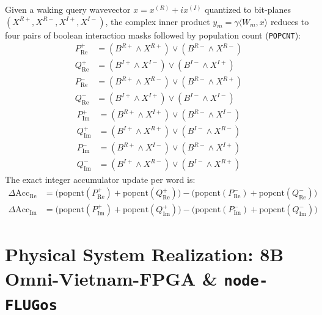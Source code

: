 \documentclass[10pt, twocolumn, a4paper]{article}
\begin{document}
Given a waking query wavevector $x = x^{(R)} + i x^{(I)}$ quantized to bit-planes $(X^{R+}, X^{R-}, X^{I+}, X^{I-})$, the complex inner product $y_m = \gamma \langle W_m, x \rangle$ reduces to four pairs of boolean interaction masks followed by population count (\texttt{POPCNT}):
\begin{align}
P_{\text{Re}}^+ &= \left(B^{R+} \land X^{R+}\right) \lor \left(B^{R-} \land X^{R-}\right) \\
Q_{\text{Re}}^+ &= \left(B^{I+} \land X^{I-}\right) \lor \left(B^{I-} \land X^{I+}\right) \\
P_{\text{Re}}^- &= \left(B^{R+} \land X^{R-}\right) \lor \left(B^{R-} \land X^{R+}\right) \\
Q_{\text{Re}}^- &= \left(B^{I+} \land X^{I+}\right) \lor \left(B^{I-} \land X^{I-}\right)
\end{align}
\begin{align}
P_{\text{Im}}^+ &= \left(B^{R+} \land X^{I+}\right) \lor \left(B^{R-} \land X^{I-}\right) \\
Q_{\text{Im}}^+ &= \left(B^{I+} \land X^{R+}\right) \lor \left(B^{I-} \land X^{R-}\right) \\
P_{\text{Im}}^- &= \left(B^{R+} \land X^{I-}\right) \lor \left(B^{R-} \land X^{I+}\right) \\
Q_{\text{Im}}^- &= \left(B^{I+} \land X^{R-}\right) \lor \left(B^{I-} \land X^{R+}\right)
\end{align}
The exact integer accumulator update per word is:
\begin{align}
\Delta \text{Acc}_{\text{Re}} &= \big(\text{popcnt}(P_{\text{Re}}^+) + \text{popcnt}(Q_{\text{Re}}^+)\big) - \big(\text{popcnt}(P_{\text{Re}}^-) + \text{popcnt}(Q_{\text{Re}}^-)\big) \\
\Delta \text{Acc}_{\text{Im}} &= \big(\text{popcnt}(P_{\text{Im}}^+) + \text{popcnt}(Q_{\text{Im}}^+)\big) - \big(\text{popcnt}(P_{\text{Im}}^-) + \text{popcnt}(Q_{\text{Im}}^-)\big)
\end{align}

\section{Physical System Realization: 8B Omni-Vietnam-FPGA \& \texttt{node-FLUGos}}
\end{document}
